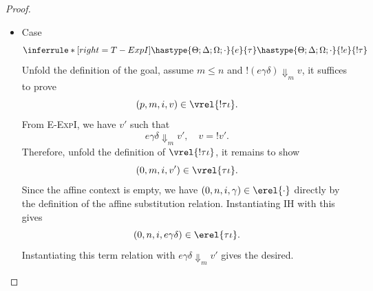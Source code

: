 \begin{proof}
\begin{itemize}
To prove (B0), we choose $p_2'$ to be $p'$, then it suffices to prove 
\begin{itemize}
  \item (1) $c+p_2' \leq p+I_1\iota(j) + I_2\iota(j)$.

  From (B2), we know $c_2+p_2' \leq p_2+p_1'+ I_2\iota(j)$.

  Adding $c_1$ on both side gives $c_1+c_2+p_2' \leq p_2+c_1+p_1'+ I_2\iota(j)$.

  From (B1), we know $c_1 + p_1' \leq p_1 + I_1\iota(j)$. 

  Therefore, we further get $c_1+c_2+p_2' \leq p_1+ p_2+ I_1\iota(j) + I_2\iota(j)$.

  Since $c = c_1+c_2$ and $p=p_1+p_2$, we obtain the desired.

  \item (2) $(p_2', r, j, v') \in \vrel{{\tau_2\iota}}$.

  Since $v' = v_2'$, we obtain the desired from (B2).

\end{itemize}

\item Case
\[
  \inferrule*[right=T-ExpI]
    {\hastype{\Theta;\Delta;\Omega;\cdot}{e}{\tau}}
    {\hastype{\Theta;\Delta;\Omega;\cdot}{!e}{!\tau}}
\]
Unfold the definition of the goal, assume $m\leq n$ and
$!(e\gamma\delta)\Downarrow_m v$, it suffices to prove
\[(p, m, i, v)\in\vrel{!\tau\iota}.\]
From \textsc{E-ExpI}, we have $v'$ such that
\[
  e\gamma\delta \Downarrow_m v', \quad v = !v'.
\]
Therefore, unfold the definition of $\vrel{!\tau\iota}$, it remains to show
\[(0, m, i, v')\in\vrel{\tau\iota}.\]
Since the affine context is empty, we have $(0, n, i, \gamma)\in\erel{\cdot}$ directly by the definition of
the affine substitution relation. Instantiating IH with this gives
\[(0, n, i, e\gamma\delta)\in\erel{\tau\iota}.\]
Instantiating this term relation with $e\gamma\delta \Downarrow_m v'$ gives the desired.


\end{itemize}
\end{proof}
